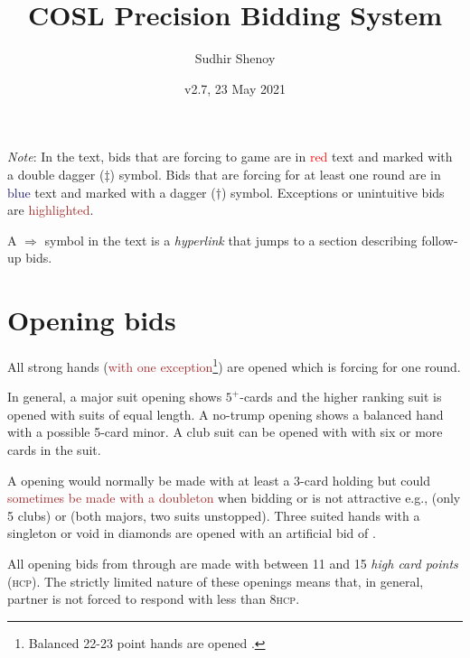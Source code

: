 \documentclass[a4paper,article,oneside]{memoir}
\newcommand{\gap}{\vspace{\baselineskip}}
\newcommand{\hcp}{\textsc{hcp}}
\newcommand{\excp}[1]{\textcolor{Brown}{#1}} %
\begin{document}
\title{COSL Precision Bidding System}
\author{Sudhir Shenoy}
\date{v2.7, 23 May 2021}
\maketitle

\tableofcontents

\gap

\emph{Note}: In the text, bids that are forcing to game are in
\textcolor{Red}{red} text and marked with a double dagger ($\ddagger$)
symbol. Bids that are forcing for at least one round are in
\textcolor{MidnightBlue}{blue} text and marked with a dagger
($\dagger$) symbol. Exceptions or unintuitive bids are
\excp{highlighted}.

A $\Rightarrow$ symbol in the text is a \emph{hyperlink} that jumps to
a section describing follow-up bids.

\pagebreak

\section{Opening bids}

All strong hands (\excp{with one exception\footnote{Balanced 22-23
    point hands are opened \nt{2}.}}) are opened  which is
forcing for one round.

In general, a major suit opening shows $5^+$-cards and the higher
ranking suit is opened with suits of equal length. A no-trump opening
shows a balanced hand with a possible 5-card minor. A club suit can be
opened with  with six or more cards in the suit.

A  opening would normally be made with at least a 3-card holding
but could \excp{sometimes be made with a doubleton} when bidding
 or  is not attractive e.g., 
(only 5 clubs) or  (both majors, two suits
unstopped). Three suited hands with a singleton or void in diamonds
are opened with an artificial bid of .

All opening bids from  through  are made with between 11
and 15 \emph{high card points} (\hcp). The strictly limited nature of
these openings means that, in general, partner is not forced to
respond with less than 8\hcp.
\end{document}
